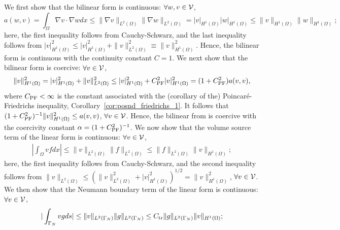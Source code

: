 We first show that the bilinear form is continuous: $\forall w,v \in \mathcal{V}$, 
\begin{equation*}
  a(w,v)
  =
  \int_\Omega \nabla v \cdot \nabla w dx
  \leq
  \| \nabla v \|_{L^2(\Omega)} \| \nabla w \|_{L^2(\Omega)}
  =
  | v |_{H^1(\Omega)} | w |_{H^1(\Omega)}
  \leq
  \| v \|_{H^1(\Omega)} \| w \|_{H^1(\Omega)};
\end{equation*}
here, the first inequality follows from Cauchy-Schwarz, and the last inequality follows from $| v |_{H^1(\Omega)}^2 \leq | v |_{H^1(\Omega)}^2 + \| v \|_{L^2(\Omega)}^2 \equiv \| v \|_{H^1(\Omega)}^2$.  Hence, the bilinear form is continuous with the continuity constant $C = 1$.
We next show that the bilinear form is coercive: $\forall v \in \mathcal{V}$,
\begin{equation*}
  \| v \|^2_{H^1(\Omega)} = | v |^2_{H^1(\Omega)} + \| v \|^2_{L^2(\Omega)}
  \leq | v |^2_{H^1(\Omega)} + C_{\rm PF}^2 | v |^2_{H^1(\Omega)}
  = (1 + C_{\rm PF}^2) a(v,v),
\end{equation*}
where $C_{\rm PF} < \infty$ is the constant associated with the (corollary of the) Poincar\'e-Friedrichs inequality, Corollary~\ref{cor:posnd_friedrichs_1}.  It follows that $(1+C_{\rm PF}^2)^{-1}\| v \|^2_{H^1(\Omega)} \leq a(v,v)$, $\forall v \in \mathcal{V}$.  Hence, the bilinear from is coercive with the coercivity constant  $\alpha = (1 + C_{\rm PF}^2)^{-1}$.  We now show that the volume source term of the linear form is continuous: $\forall v \in \mathcal{V}$,
\begin{align}
  |\int_\Omega vf dx|
  \leq \| v \|_{L^2(\Omega)} \| f \|_{L^2(\Omega)}
  \leq \| f \|_{L^2(\Omega)} \| v \|_{H^1(\Omega)};
  \label{eq:posnd_example_f}
\end{align}
here, the first inequality follows from Cauchy-Schwarz, and the second inequality follows from $\| v\|_{L^2(\Omega)} \leq (\| v \|^2_{L^2(\Omega)} + | v |_{H^1(\Omega)}^2)^{1/2} = \| v \|_{H^1(\Omega)}^2$, $\forall v \in \mathcal{V}$. We then show that the Neumann boundary term of the linear form is continuous: $\forall v \in \mathcal{V}$,
\begin{align}
  |\int_{\Gamma_N} vgds|
  \leq \| v \|_{L^2(\Gamma_N)} \| g \|_{L^2(\Gamma_N)}
  \leq C_{\rm tr} \| g \|_{L^2(\Gamma_N)}  \| v \|_{H^1(\Omega)};
  \label{eq:posnd_example_g}
\end{align}

